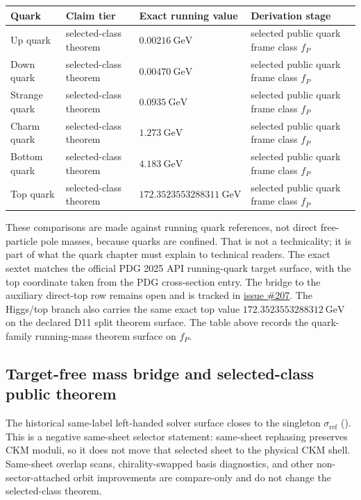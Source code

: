 \documentclass[11pt]{article}
\newcommand{\ophid}[1]{\path{#1}}
\begin{document}
\begin{table}[h]
\centering
\small
\begin{tabular}{@{}llll@{}}
\toprule
Quark & Claim tier & Exact running value & Derivation stage \\
\midrule
Up quark & selected-class theorem & \(0.00216~\mathrm{GeV}\) & selected public quark frame class \(f_P\) \\
Down quark & selected-class theorem & \(0.00470~\mathrm{GeV}\) & selected public quark frame class \(f_P\) \\
Strange quark & selected-class theorem & \(0.0935~\mathrm{GeV}\) & selected public quark frame class \(f_P\) \\
Charm quark & selected-class theorem & \(1.273~\mathrm{GeV}\) & selected public quark frame class \(f_P\) \\
Bottom quark & selected-class theorem & \(4.183~\mathrm{GeV}\) & selected public quark frame class \(f_P\) \\
Top quark & selected-class theorem & \(172.3523553288311~\mathrm{GeV}\) & selected public quark frame class \(f_P\) \\
\bottomrule
\end{tabular}
\end{table}

These comparisons are made against running quark references, not direct free-particle pole
masses, because quarks are confined. That is not a technicality; it is part of what the quark
chapter must explain to technical readers. The exact sextet matches the official PDG 2025 API
running-quark target surface, with the top coordinate taken from the PDG cross-section entry. The
bridge to the auxiliary direct-top row remains open and is tracked in
\href{https://github.com/FloatingPragma/observer-patch-holography/issues/207}{issue \#207}. The Higgs/top branch also carries the same exact
top value \(172.3523553288312~\mathrm{GeV}\) on the declared D11 split theorem surface. The table above
records the quark-family running-mass theorem surface on \(f_P\).

\subsection{Target-free mass bridge and selected-class public theorem}\label{quark-family-strongest-overlap-branch-primitives}

The historical same-label left-handed solver surface closes to the singleton
\(\sigma_{\mathrm{ref}}\) (\ophid{sigma_ref}). This is a negative same-sheet selector statement:
same-sheet rephasing preserves CKM moduli, so it does not move that selected sheet to the
physical CKM shell. Same-sheet overlap scans, chirality-swapped basis diagnostics, and other
non-sector-attached orbit improvements are compare-only and do not change the selected-class
theorem.
\end{document}
